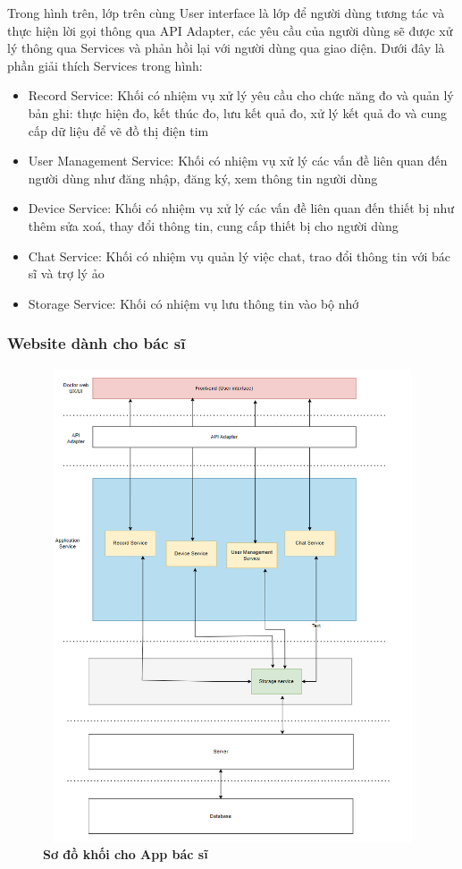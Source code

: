 Trong hình trên, lớp trên cùng User interface là lớp để người dùng tương tác và thực hiện lời gọi thông qua API Adapter, 
các yêu cầu của người dùng sẽ được xử lý thông qua Services và phản hồi lại với người dùng qua giao diện. Dưới đây là phần
giải thích Services trong hình:
\begin{adjustwidth}{1.5em}{}
\begin{itemize}
  \item Record Service: Khối có nhiệm vụ xử lý yêu cầu cho chức năng đo và quản lý bản ghi: thực hiện đo, kết thúc đo, lưu kết quả đo, xử lý kết quả đo và cung cấp dữ liệu để vẽ đồ thị điện tim
  \item User Management Service: Khối có nhiệm vụ xử lý các vấn đề liên quan đến người dùng như đăng nhập, đăng ký, xem thông tin người dùng
  \item Device Service: Khối có nhiệm vụ xử lý các vấn đề liên quan đến thiết bị như thêm sửa xoá, thay đổi thông tin, cung cấp thiết bị cho người dùng
  \item Chat Service: Khối có nhiệm vụ quản lý việc chat, trao đổi thông tin với bác sĩ và trợ lý ảo
  \item Storage Service: Khối có nhiệm vụ lưu thông tin vào bộ nhớ
\end{itemize}
\end{adjustwidth}


\subsubsection{Website dành cho bác sĩ}

\begin{figure}[H]
  \centering
  \includegraphics[width=12cm,height=14cm]{Images/system/fmECG_architecture-Doctors.drawio.png}
  \caption[Sơ đồ khói cho App bác sĩ]{\bfseries \fontsize{12pt}{0pt}\selectfont Sơ đồ khối cho App bác sĩ}
  \label{fmECG_architecture-Doctors} %
\end{figure}

